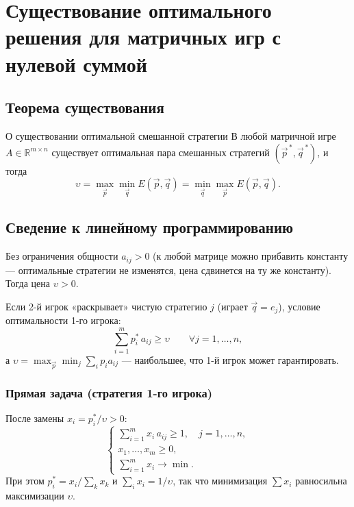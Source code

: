 
\section{Существование оптимального решения для матричных игр с нулевой суммой}

\subsection{Теорема существования}

\begin{Theorem}{О существовании оптимальной смешанной стратегии}{}
	В любой матричной игре $A\in\mathbb{R}^{m\times n}$ существует оптимальная пара смешанных стратегий $(\vec p^{\,*},\vec q^{\,*})$, и тогда
	\[
	\upsilon=\max_{\vec p}\min_{\vec q}E(\vec p,\vec q)=\min_{\vec q}\max_{\vec p}E(\vec p,\vec q).
	\]
\end{Theorem}

\subsection{Сведение к линейному программированию}

Без ограничения общности $a_{ij}>0$ (к любой матрице можно прибавить константу — оптимальные стратегии не изменятся, цена сдвинется на ту же константу). Тогда цена $\upsilon>0$.

Если 2-й игрок «раскрывает» чистую стратегию $j$ (играет $\vec q=e_j$), условие оптимальности 1-го игрока:
\[
\sum_{i=1}^m p_i^*\,a_{ij}\ge\upsilon\qquad\forall j=1,\dots,n,
\]
а $\upsilon=\max_{\vec p}\min_j\sum_i p_i a_{ij}$ — наибольшее, что 1-й игрок может гарантировать.

\subsubsection*{Прямая задача (стратегия 1-го игрока)}

После замены $x_i=p_i^*/\upsilon>0$:
\[
\begin{cases}
	\displaystyle\sum_{i=1}^m x_i\,a_{ij}\ge 1,\quad j=1,\dots,n,\\[4pt]
	x_1,\dots,x_m\ge 0,\\[2pt]
	\displaystyle\sum_{i=1}^m x_i\longrightarrow\min.
\end{cases}
\]
При этом $p_i^*=x_i/\sum_k x_k$ и $\sum_i x_i=1/\upsilon$, так что минимизация $\sum x_i$ равносильна максимизации $\upsilon$.

